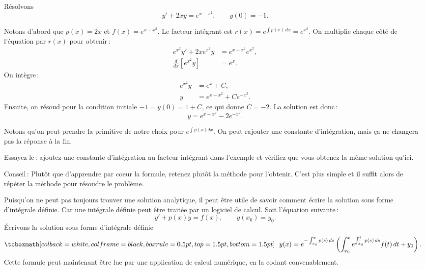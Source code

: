 \begin{example}
Résolvons 
\begin{equation*}
y' + 2xy = e^{x-x^2}, \qquad y(0) = -1 .
\end{equation*}

Notons d'abord que $p(x) = 2x$ et $f(x) = e^{x-x^2}$.
Le facteur intégrant est $r(x) = e^{\int p(x)\, dx} = e^{x^2}$.
On multiplie chaque côté de l'équation par $r(x)$ pour obtenir\,:
\begin{align*}
e^{x^2} y' + 2xe^{x^2}y & = e^{x-x^2} e^{x^2} , \\
\frac{d}{dx} \left[ e^{x^2} y \right] &= e^x .
\end{align*}
On intègre\,: 
\begin{align*}
e^{x^2} y &= e^x +C , \\
y &= e^{x-x^2} + C e^{-x^2} .
\end{align*}
Ensuite, on résoud pour la condition initiale $-1 = y(0) = 1 + C$, ce qui donne $C=-2$.
La solution est donc\,:
\begin{equation*}
y = e^{x-x^2} - 2 e^{-x^2} .
\end{equation*}
\end{example}
Notons qu'on peut prendre la primitive de notre choix pour 
$e^{\int p(x) dx}$.  On peut rajouter une constante d'intégration, mais ça ne changera pas la réponse à la fin.

\begin{exercise}
Essayez-le\,: ajoutez une constante d'intégration au facteur intégrant dans l'exemple et vérifiez que vous obtenez la même solution qu'ici.
\end{exercise}

Conseil\,: Plutôt que d'apprendre par coeur la formule, retenez plutôt la méthode pour l'obtenir.  C'est plus simple et il suffit alors de répéter la méthode pour résoudre le problème. 

Puisqu'on ne peut pas toujours trouver une solution analytique, il peut être utile de savoir comment écrire la solution sous forme d'intégrale définie.  Car une intégrale définie peut être traitée par un logiciel de calcul.  Soit l'équation suivante\,:
\begin{equation*}
y' + p(x) y = f(x) , \qquad y(x_0) = y_0 .
\end{equation*}
Écrivons la solution sous forme d'intégrale définie 
\begin{equation} \label{lei:defsol}
\mybxbg{
~~
y(x) = e^{-\int_{x_0}^x p(s)\, ds} \left( \int_{x_0}^x e^{\int_{x_0}^t p(s)\, ds}
f(t) \,dt + y_0 \right).
~~
}
\end{equation}
Cette formule peut maintenant être lue par une application de calcul numérique, en la codant convenablement.

